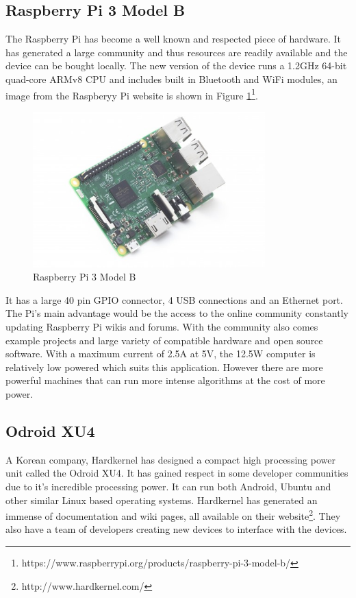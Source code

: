 			\subsection{Raspberry Pi 3 Model B}
			
			The Raspberry Pi has become a well known and respected piece of hardware. It has generated a large community and thus resources are readily available and the device can be bought locally. The new version of the device runs a 1.2GHz 64-bit quad-core ARMv8 CPU and includes built in Bluetooth and WiFi modules, an image from the Raspberyy Pi website is shown in Figure \ref{IM_Pi}\footnote{https://www.raspberrypi.org/products/raspberry-pi-3-model-b/}. 
			
			\begin{figure}[H]
				\centering
				\includegraphics[height = 6cm]{Images/System/Pi.jpg}     
				\caption{Raspberry Pi 3 Model B}
				\label{IM_Pi}
			\end{figure}
						
			It has a large 40 pin GPIO connector, 4 USB connections and an Ethernet port. The Pi's main advantage would be the access to the online community constantly updating Raspberry Pi wikis and forums. With the community also comes example projects and large variety of compatible hardware and open source software. With a maximum current of 2.5A at 5V, the 12.5W computer is relatively low powered which suits this application. However there are more powerful machines that can run more intense algorithms at the cost of more power.
			
			\subsection{Odroid XU4}
			A Korean company, Hardkernel has designed a compact high processing power unit called the Odroid XU4. It has gained respect in some developer communities due to it's incredible processing power. It can run both Android, Ubuntu and other similar Linux based operating systems. Hardkernel has generated an immense of documentation and wiki pages, all available on their website\footnote{http://www.hardkernel.com/}. They also have a team of developers creating new devices to interface with the devices. 
			
